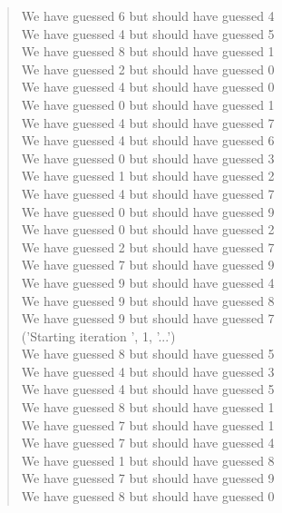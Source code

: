 \documentclass{article}
\begin{document}
\begin{quote}
        We have guessed 6 but should have guessed 4\\
        We have guessed 4 but should have guessed 5\\
        We have guessed 8 but should have guessed 1\\
        We have guessed 2 but should have guessed 0\\
        We have guessed 4 but should have guessed 0\\
        We have guessed 0 but should have guessed 1\\
        We have guessed 4 but should have guessed 7\\
        We have guessed 4 but should have guessed 6\\
        We have guessed 0 but should have guessed 3\\
        We have guessed 1 but should have guessed 2\\
        We have guessed 4 but should have guessed 7\\
        We have guessed 0 but should have guessed 9\\
        We have guessed 0 but should have guessed 2\\
        We have guessed 2 but should have guessed 7\\
        We have guessed 7 but should have guessed 9\\
        We have guessed 9 but should have guessed 4\\
        We have guessed 9 but should have guessed 8\\
        We have guessed 9 but should have guessed 7\\
        ('Starting iteration ', 1, '...')\\
        We have guessed 8 but should have guessed 5\\
        We have guessed 4 but should have guessed 3\\
        We have guessed 4 but should have guessed 5\\
        We have guessed 8 but should have guessed 1\\
        We have guessed 7 but should have guessed 1\\
        We have guessed 7 but should have guessed 4\\
        We have guessed 1 but should have guessed 8\\
        We have guessed 7 but should have guessed 9\\
        We have guessed 8 but should have guessed 0\\

\end{quote}
\end{document}
